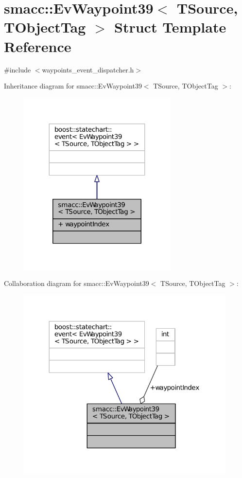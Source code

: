 \hypertarget{structsmacc_1_1EvWaypoint39}{}\section{smacc\+:\+:Ev\+Waypoint39$<$ T\+Source, T\+Object\+Tag $>$ Struct Template Reference}
\label{structsmacc_1_1EvWaypoint39}


{\ttfamily \#include $<$waypoints\+\_\+event\+\_\+dispatcher.\+h$>$}



Inheritance diagram for smacc\+:\+:Ev\+Waypoint39$<$ T\+Source, T\+Object\+Tag $>$\+:
\nopagebreak
\begin{figure}[H]
\begin{center}
\leavevmode
\includegraphics[width=227pt]{structsmacc_1_1EvWaypoint39__inherit__graph}
\end{center}
\end{figure}


Collaboration diagram for smacc\+:\+:Ev\+Waypoint39$<$ T\+Source, T\+Object\+Tag $>$\+:
\nopagebreak
\begin{figure}[H]
\begin{center}
\leavevmode
\includegraphics[width=312pt]{structsmacc_1_1EvWaypoint39__coll__graph}
\end{center}
\end{figure}
